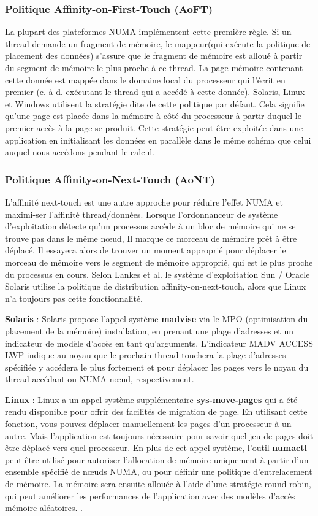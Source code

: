 \subsubsection{Politique Affinity-on-First-Touch (AoFT)}
%
La plupart des plateformes NUMA implémentent cette première règle.
Si un thread demande un fragment de mémoire, le mappeur(qui exécute la politique de placement des données) s'assure que le fragment de mémoire est alloué à partir du segment de mémoire le plus proche à ce thread. %
La page mémoire contenant cette donnée est mappée dans le domaine local du processeur qui l'écrit en premier (c.-à-d. exécutant le thread qui a accédé à cette donnée). \cite{Mark11}
Solaris, Linux et Windows utilisent la stratégie dite de cette politique par défaut. 
Cela signifie qu'une page est placée dans la mémoire à côté du processeur à partir duquel le premier accès à la page se produit. 
Cette stratégie peut être exploitée dans une application en initialisant les données en parallèle dans le même schéma que celui auquel nous accédons pendant le calcul. 
%
\subsubsection{Politique Affinity-on-Next-Touch (AoNT)}
%
L'affinité next-touch est une autre approche pour réduire l'effet NUMA et maximi-ser l'affinité thread/données.
Lorsque l'ordonnanceur de système d'exploitation détecte qu'un processus accède à un bloc de mémoire qui ne se trouve pas dans le même nœud,
Il marque ce morceau de mémoire prêt à être déplacé.
Il essayera alors de trouver un moment approprié pour déplacer le morceau de mémoire vers le segment de mémoire approprié, qui est le plus proche du processus en cours. 
Selon Lankes et al. \cite {lak-pan} le système d'exploitation Sun / Oracle Solaris utilise la politique de distribution affinity-on-next-touch, alors que Linux n'a toujours pas cette fonctionnalité.

\textbf{Solaris} : Solaris propose l'appel système \textbf{madvise} via le MPO (optimisation du placement de la mémoire) installation, en prenant une plage d'adresses et un indicateur de modèle d'accès en tant qu'arguments. 
L'indicateur MADV ACCESS LWP indique au noyau que le prochain thread touchera la plage d'adresses spécifiée y accédera le plus fortement et pour déplacer les pages vers le noyau du thread accédant ou NUMA nœud, respectivement. 

\textbf{Linux} : Linux a un appel système supplémentaire \textbf{sys-move-pages} qui a été rendu disponible pour offrir des facilités de migration de page. 
En utilisant cette fonction, vous pouvez déplacer manuellement les pages d'un processeur à un autre. 
Mais l'application est toujours nécessaire pour savoir quel jeu de pages doit être déplacé vers quel processeur. 
En plus de cet appel système, l'outil \textbf{numactl} \cite{Linux13} peut être utilisé pour autoriser l'allocation de mémoire uniquement à partir d'un ensemble spécifié de nœuds NUMA, ou pour définir une politique d'entrelacement de mémoire. 
La mémoire sera ensuite allouée à l'aide d'une stratégie round-robin, qui peut améliorer les performances de l'application avec des modèles d'accès mémoire aléatoires. \cite{Dreb15}.

